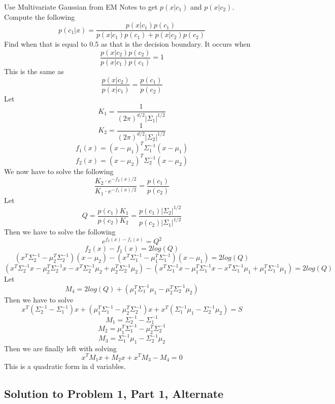 \documentclass[11pt,psfig]{article}
\begin{document}
Use Multivariate Gaussian from EM Notes to get $p(x|c_1)$ and $p(x|c_2)$. Compute the following
\[
p(c_1|x) = \frac{p(x|c_1)p(c_1)}{p(x|c_1)p(c_1) + p(x|c_2)p(c_2)}
\]
Find when that is equal to 0.5 as that is the decision boundary. It occurs when
\[
\frac{p(x|c_2)p(c_2)}{p(x|c_1)p(c_1)} = 1
\]
This is the same as
\[
\frac{p(x|c_2)}{p(x|c_1)} = \frac{p(c_1)}{p(c_2)}
\]
Let
\[
K_1 = \frac{1}{(2\pi)^{d/2}|\Sigma_1|^{1/2}}
\]
\[
K_2 = \frac{1}{(2\pi)^{d/2}|\Sigma_2|^{1/2}}
\]
\[
f_1(x) = (x-\mu_1)^T \Sigma_1^{-1} (x-\mu_1)
\]
\[
f_2(x) = (x-\mu_2)^T \Sigma_2^{-1} (x-\mu_2)
\]
We now have to solve the following
\[
\frac{K_2 \cdot e^{-f_2(x)/2}}{K_1 \cdot e^{-f_1(x)/2}} = \frac{p(c_1)}{p(c_2)}
\]
Let
\[
Q = \frac{p(c_1)K_1}{p(c_2)K_2} = \frac{p(c_1)|\Sigma_2|^{1/2}}{p(c_2)|\Sigma_1|^{1/2}}
\]
Then we have to solve the following
\[
e^{f_2(x) - f_1(x)} = Q^2
\]
\[
f_2(x) - f_1(x) = 2 log(Q)
\]
\[
(x^T \Sigma_2^{-1} - \mu_2^T \Sigma_2^{-1})(x - \mu_2) - (x^T \Sigma_1^{-1} - \mu_1^T \Sigma_1^{-1})(x - \mu_1) = 2 log(Q)
\]
\[
(x^T \Sigma_2^{-1} x - \mu_2^T \Sigma_2^{-1} x - x^T \Sigma_2^{-1} \mu_2 + \mu_2^T \Sigma_2^{-1} \mu_2) - (x^T \Sigma_1^{-1} x - \mu_1^T \Sigma_1^{-1} x - x^T \Sigma_1^{-1} \mu_1 + \mu_1^T \Sigma_1^{-1} \mu_1) = 2 log(Q)
\]
Let
\[
M_4 = 2log(Q) + (\mu_1^T \Sigma_1^{-1} \mu_1 - \mu_2^T \Sigma_2^{-1} \mu_2)
\]
Then we have to solve
\[
x^T (\Sigma_2^{-1} - \Sigma_1^{-1})x + (\mu_1^T \Sigma_1^{-1} - \mu_2^T \Sigma_2^{-1}) x + x^T (\Sigma_1^{-1} \mu_1 - \Sigma_2^{-1} \mu_2) = S
\]
\[
M_1 = \Sigma_2^{-1} - \Sigma_1^{-1}
\]
\[
M_2 = \mu_1^T \Sigma_1^{-1} - \mu_2^T \Sigma_2^{-1}
\]
\[
M_3 = \Sigma_1^{-1} \mu_1 - \Sigma_2^{-1} \mu_2
\]
Then we are finally left with solving
\[
x^T M_1 x + M_2 x + x^T M_3 - M_4 = 0
\]
This is a quadratic form in d variables. 

\subsection{Solution to Problem 1, Part 1, Alternate}
\end{document}
